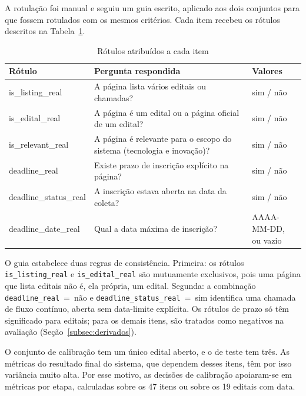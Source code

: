 A rotulação foi manual e seguiu um guia escrito, aplicado aos dois conjuntos
para que fossem rotulados com os mesmos critérios. Cada item recebeu os rótulos
descritos na Tabela~\ref{tab:rotulos}.

\begin{table}[htbp]
\centering
\caption{Rótulos atribuídos a cada item}
\label{tab:rotulos}
\small
\begin{tabularx}{\textwidth}{>{\ttfamily}l X l}
\toprule
\normalfont Rótulo & Pergunta respondida & Valores \\
\midrule
is\_listing\_real       & A página lista vários editais ou chamadas? & sim / não \\
is\_edital\_real        & A página é um edital ou a página oficial de um edital? & sim / não \\
is\_relevant\_real      & A página é relevante para o escopo do sistema (tecnologia e inovação)? & sim / não \\
deadline\_real          & Existe prazo de inscrição explícito na página? & sim / não \\
deadline\_status\_real  & A inscrição estava aberta na data da coleta? & sim / não \\
deadline\_date\_real    & Qual a data máxima de inscrição? & \makecell[l]{AAAA-MM-DD,\\ou vazio} \\
\bottomrule
\end{tabularx}
\end{table}

O guia estabelece duas regras de consistência. Primeira: os rótulos
\texttt{is\_listing\_real} e \texttt{is\_edital\_real} são mutuamente
exclusivos, pois uma página que lista editais não é, ela própria, um edital.
Segunda: a combinação \texttt{deadline\_real}~=~não e
\texttt{deadline\_status\_real}~=~sim identifica uma chamada de fluxo contínuo,
aberta sem data-limite explícita. Os rótulos de prazo só têm significado para
editais; para os demais itens, são tratados como negativos na avaliação
(Seção~\ref{subsec:derivados}).

O conjunto de calibração tem um único edital aberto, e o de teste tem três.
As métricas do resultado final do sistema, que dependem desses itens, têm por
isso variância muito alta. Por esse motivo, as decisões de calibração
apoiaram-se em métricas por etapa, calculadas sobre os 47 itens ou sobre os 19
editais com data.

